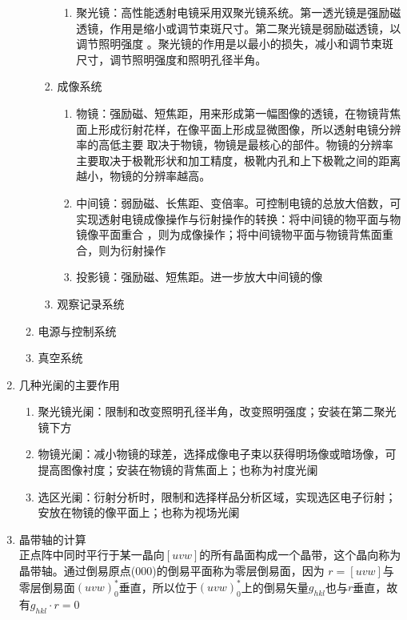 \documentclass[12pt,a4paper]{article}
\begin{document}
\begin{enumerate}
\begin{enumerate}
\begin{enumerate}
\begin{enumerate}
                    \item 聚光镜：高性能透射电镜采用双聚光镜系统。第一透光镜是强励磁透镜，作用是缩小或调节束斑尺寸。第二聚光镜是弱励磁透镜，以调节照明强度
                        。聚光镜的作用是以最小的损失，减小和调节束斑尺寸，调节照明强度和照明孔径半角。
                \end{enumerate}
                \item 成像系统
                \begin{enumerate}
                    \item 物镜：强励磁、短焦距，用来形成第一幅图像的透镜，在物镜背焦面上形成衍射花样，在像平面上形成显微图像，所以透射电镜分辨率的高低主要
                        取决于物镜，物镜是最核心的部件。物镜的分辨率主要取决于极靴形状和加工精度，极靴内孔和上下极靴之间的距离越小，物镜的分辨率越高。
                    \item 中间镜：弱励磁、长焦距、变倍率。可控制电镜的总放大倍数，可实现透射电镜成像操作与衍射操作的转换：将中间镜的物平面与物镜像平面重合
                        ，则为成像操作；将中间镜物平面与物镜背焦面重合，则为衍射操作
                    \item 投影镜：强励磁、短焦距。进一步放大中间镜的像
                \end{enumerate}
                \item 观察记录系统
            \end{enumerate}
            \item 电源与控制系统
            \item 真空系统
        \end{enumerate}
        \item 几种光阑的主要作用
        \begin{enumerate}
            \item 聚光镜光阑：限制和改变照明孔径半角，改变照明强度；安装在第二聚光镜下方
            \item 物镜光阑：减小物镜的球差，选择成像电子束以获得明场像或暗场像，可提高图像衬度；安装在物镜的背焦面上；也称为衬度光阑
            \item 选区光阑：衍射分析时，限制和选择样品分析区域，实现选区电子衍射；安放在物镜的像平面上；也称为视场光阑
        \end{enumerate}
        \item 晶带轴的计算\\正点阵中同时平行于某一晶向$[uvw]$的所有晶面构成一个晶带，这个晶向称为晶带轴。通过倒易原点(000)的倒易平面称为零层倒易面，因为
            $r=[uvw]$与零层倒易面$(uvw)_{0}^{*}$垂直，所以位于$(uvw)_{0}^{*}$上的倒易矢量$g_{hkl}$也与$r$垂直，故有$g_{h k l} \cdot r=0$

\end{enumerate}
\end{document}
